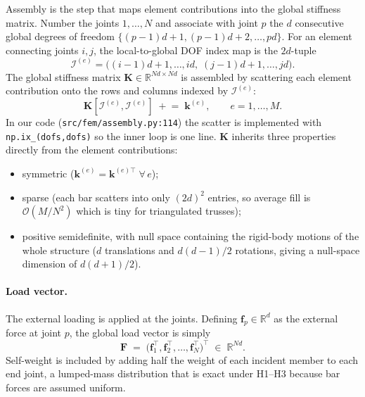 Assembly is the step that maps element contributions into the
global stiffness matrix. Number the joints $1,\dotsc,N$ and
associate with joint $p$ the $d$ consecutive global degrees of
freedom
$\{(p-1)d+1,(p-1)d+2,\dotsc,pd\}$. For an element connecting
joints $i,j$, the local-to-global DOF index map is the
$2d$-tuple
\begin{equation}
  \mathcal{I}^{(e)}
  =\bigl((i-1)d+1,\dotsc,id,\;(j-1)d+1,\dotsc,jd\bigr).
\end{equation}
The global stiffness matrix $\mathbf{K}\in\mathbb{R}^{Nd\times Nd}$
is assembled by scattering each element contribution onto the
rows and columns indexed by $\mathcal{I}^{(e)}$:
\begin{equation}
  \mathbf{K}[\mathcal{I}^{(e)},\mathcal{I}^{(e)}]
  \;\mathrel{+}=\;\mathbf{k}^{(e)},
  \qquad e=1,\dotsc,M.
  \label{eq:global_assembly}
\end{equation}
In our code (\texttt{src/fem/assembly.py:114}) the scatter is
implemented with \texttt{np.ix\_(dofs,dofs)} so the inner loop is
one line. $\mathbf{K}$ inherits three properties directly from
the element contributions:
\begin{itemize}
  \item symmetric ($\mathbf{k}^{(e)}=\mathbf{k}^{(e)\top}\;\forall\,e$);
  \item sparse (each bar scatters into only $(2d)^2$ entries,
        so average fill is $\mathcal{O}(M/N^2)$ which is tiny for
        triangulated trusses);
  \item positive semidefinite, with null space containing the
        rigid-body motions of the whole structure
        ($d$ translations and $d(d-1)/2$ rotations, giving a
        null-space dimension of $d(d+1)/2$).
\end{itemize}

\paragraph{Load vector.} The external loading is applied at the
joints. Defining $\mathbf{f}_p\in\mathbb{R}^d$ as the external
force at joint $p$, the global load vector is simply
\begin{equation}
  \mathbf{F}\;=\;
  \bigl(\mathbf{f}_1^\top,\mathbf{f}_2^\top,\dotsc,\mathbf{f}_N^\top\bigr)^\top
  \;\in\;\mathbb{R}^{Nd}.
\end{equation}
Self-weight is included by adding half the weight of each
incident member to each end joint, a lumped-mass distribution
that is exact under H1--H3 because bar forces are assumed
uniform.

